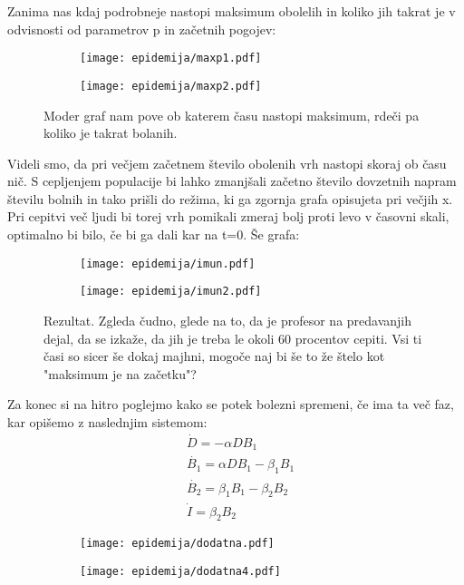 \documentclass{article}
\begin{document}
Zanima nas kdaj podrobneje nastopi maksimum obolelih in koliko jih takrat je v odvisnosti od parametrov p in začetnih pogojev:

\begin{figure}[H]
\centering
\begin{subfigure}{.49\textwidth}
\texttt{[image: epidemija/maxp1.pdf]}
\end{subfigure}
\begin{subfigure}{.49\textwidth}
\texttt{[image: epidemija/maxp2.pdf]}
\end{subfigure}
\caption*{Moder graf nam pove ob katerem času nastopi maksimum, rdeči pa koliko je takrat bolanih.}
\end{figure}

Videli smo, da pri večjem začetnem število obolenih vrh nastopi skoraj ob času nič. S cepljenjem populacije bi lahko zmanjšali začetno število dovzetnih napram številu bolnih in tako prišli do režima, ki ga zgornja grafa opisujeta pri večjih x. Pri cepitvi več ljudi bi torej vrh pomikali zmeraj bolj proti levo v časovni skali, optimalno bi bilo, če bi ga dali kar na t=0. Še grafa:

\begin{figure}[H]
\centering
\begin{subfigure}{.49\textwidth}
\texttt{[image: epidemija/imun.pdf]}
\end{subfigure}
\begin{subfigure}{.49\textwidth}
\texttt{[image: epidemija/imun2.pdf]}
\end{subfigure}
\caption*{Rezultat. Zgleda čudno, glede na to, da je profesor na predavanjih dejal, da se izkaže, da jih je treba le okoli 60 procentov cepiti. Vsi ti časi so sicer še dokaj majhni, mogoče naj bi še to že štelo kot "maksimum je na začetku"?}
\end{figure}


Za konec si na hitro poglejmo kako se potek bolezni spremeni, če ima ta več faz, kar opišemo z naslednjim sistemom:
\begin{align*}
&\dot{D} = -\alpha D B_1 \\
&\dot{B_1} = \alpha D B_1 - \beta_1  B_1 \\
&\dot{B_2} = \beta_1 B_1 - \beta_2 B_2 \\
&\dot{I} = \beta_2 B_2
\end{align*}

\begin{figure}[H]
\centering
\begin{subfigure}{.49\textwidth}
\texttt{[image: epidemija/dodatna.pdf]}
\end{subfigure}
\begin{subfigure}{.49\textwidth}
\texttt{[image: epidemija/dodatna4.pdf]}
\end{subfigure}
\end{figure}
\end{document}

